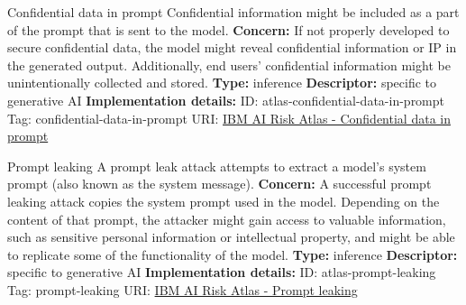 \documentclass[a4paper,12pt]{article}
\begin{document}
\begin{definitionbox}{Confidential data in prompt}
Confidential information might be included as a part of the prompt that is sent to the model.\newline\newline
\textbf{Concern: }If not properly developed to secure confidential data, the model might reveal confidential information or IP in the generated output. Additionally, end users' confidential information might be unintentionally collected and stored.\newline\newline
\textbf{Type: }inference\newline
\textbf{Descriptor: }specific to generative AI \newline\newline
\textbf{Implementation details: } \newline
ID: atlas-confidential-data-in-prompt \newline
Tag: confidential-data-in-prompt \newline
URI:  \href{https://www.ibm.com/docs/en/watsonx/saas?topic=SSYOK8/wsj/ai-risk-atlas/confidential-data-in-prompt.html}{IBM AI Risk Atlas - Confidential data in prompt}\newline
\end{definitionbox}
\begin{definitionbox}{Prompt leaking}
A prompt leak attack attempts to extract a model's system prompt (also known as the system message).\newline\newline
\textbf{Concern: }A successful prompt leaking attack copies the system prompt used in the model. Depending on the content of that prompt, the attacker might gain access to valuable information, such as sensitive personal information or intellectual property, and might be able to replicate some of the functionality of the model.\newline\newline
\textbf{Type: }inference\newline
\textbf{Descriptor: }specific to generative AI \newline\newline
\textbf{Implementation details: } \newline
ID: atlas-prompt-leaking \newline
Tag: prompt-leaking \newline
URI:  \href{https://www.ibm.com/docs/en/watsonx/saas?topic=SSYOK8/wsj/ai-risk-atlas/prompt-leaking.html}{IBM AI Risk Atlas - Prompt leaking}\newline
\end{definitionbox}
\end{document}
